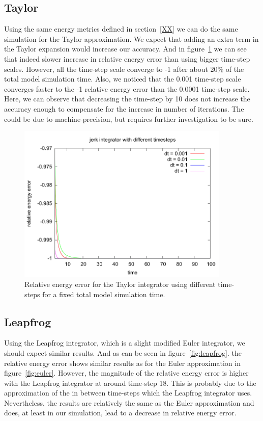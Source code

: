 \documentclass[11pt]{article} %
\begin{document}
\subsection{Taylor}
\label{sec:res:taylor}
Using the same energy metrics defined in section~\ref{XX} we can do the same simulation for the Taylor approximation. We expect that adding an extra term in the Taylor expansion would increase our accuracy. And in figure~\ref{fig:taylor} we can see that indeed slower increase in relative energy error than using bigger time-step scales. However, all the time-step scale converge to -1 after about 20\% of the total model simulation time. Also, we noticed that the 0.001 time-step scale converges faster to the -1 relative energy error than the 0.0001 time-step scale. Here, we can observe that decreasing the time-step by 10 does not increase the accuracy enough to compensate for the increase in number of iterations. The could be due to machine-precision, but requires further investigation to be sure.

\begin{figure}
    \includegraphics[width=0.9\textwidth]{jerk_different_timesteps_truncated.png}
    \caption{Relative energy error for the Taylor integrator using different time-steps for a fixed total model simulation time.}
    \label{fig:taylor}
\end{figure}

\subsection{Leapfrog}
\label{sec:res:leapfrog}
Using the Leapfrog integrator, which is a slight modified Euler integrator, we should expect similar results. And as can be seen in figure~\ref{fig:leapfrog}. the relative energy error shows similar results as for the Euler approximation in figure~\ref{fig:euler}. However, the magnitude of the relative energy error is higher with the Leapfrog integrator at around time-step 18. This is probably due to the approximation of the in between time-steps which the Leapfrog integrator uses. Nevertheless, the results are relatively the same as the Euler approximation and does, at least in our simulation, lead to a decrease in relative energy error.
\end{document}
